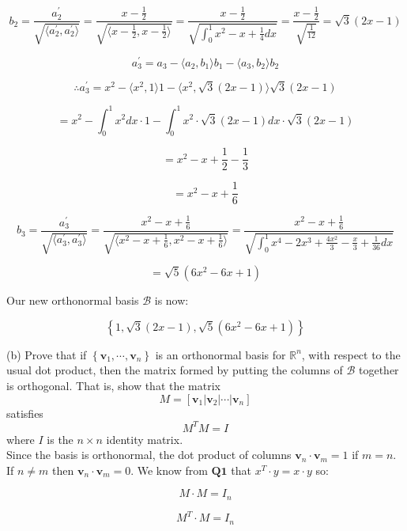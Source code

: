 \documentclass[12pt]{article}
\begin{document}
$$
b_2=\frac{a_{2}^{'}}{\sqrt{\langle a_{2}^{'}, a_{2}^{'} \rangle}}
= \frac{x-\frac{1}{2}}{\sqrt{\langle x-\frac{1}{2} , x-\frac{1}{2} \rangle}}
= \frac{x-\frac{1}{2}}{\sqrt{\int_{0}^{1}x^2-x+\frac{1}{4}dx}}
= \frac{x-\frac{1}{2}}{\sqrt{\frac{1}{12}}}
= \sqrt{3}(2x-1)
$$

$$
a_{3}^{'}=a_3-\langle a_2, b_1 \rangle b_1 - \langle a_3, b_2 \rangle b_2 
$$

$$
\therefore a_{3}^{'}=
x^2-
\langle x^2, 1 \rangle 1
-\langle x^2, \sqrt{3}(2x-1) \rangle \sqrt{3}(2x-1) 
$$

$$
= x^2
-\int_{0}^{1}x^2dx\cdot 1-\int_{0}^{1}x^2\cdot \sqrt{3}(2x-1)dx\cdot \sqrt{3}(2x-1)
$$

$$
=x^2-x+\frac{1}{2}-\frac{1}{3}
$$

$$
=x^2-x+\frac{1}{6}
$$

$$
b_3
=\frac{a_{3}^{'}}{\sqrt{\langle a_{3}^{'}, a_{3}^{'} \rangle}}
=\frac{x^2-x+\frac{1}{6}}{\sqrt{\langle x^2-x+\frac{1}{6}, x^2-x+\frac{1}{6}\rangle}}
=\frac{x^2-x+\frac{1}{6}}{\sqrt{\int_{0}^{1}x^4-2x^3+\frac{4x^2}{3}-\frac{x}{3}+\frac{1}{36}dx}}
$$

$$
=\sqrt{5}(6x^2-6x+1)
$$

Our new orthonormal basis $\mathcal{B}$ is now:

$$
\left\lbrace
1, \sqrt{3}(2x-1), \sqrt{5}(6x^2-6x+1)
\right\rbrace
$$

(b) Prove that if $\left\lbrace \mathbf{v}_1, \cdots, \mathbf{v}_n \right\rbrace$ is an orthonormal basis for $\mathbb{R}^n$, with respect to the usual dot product, then the matrix formed by putting the columns of $\mathcal{B}$ together is orthogonal. That is, show that the matrix
$$
M=\left[ \mathbf{v}_1 | \mathbf{v}_2 | \cdots | \mathbf{v}_n \right]
$$
satisfies
$$
M^TM=I
$$
where $I$ is the $n \times n$ identity matrix.\\
\medskip
Since the basis is orthonormal, the dot product of columns $\mathbf{v}_n\cdot \mathbf{v}_m = 1$ if $m=n$. \\ 
If $n\neq m$ then $\mathbf{v}_n\cdot \mathbf{v}_m=0$. We know from $\textbf{Q1}$ that $x^T \cdot y=x \cdot y$ so:

$$
M\cdot M=I_n
$$

$$
M^T\cdot M=I_n
$$
\end{document}
